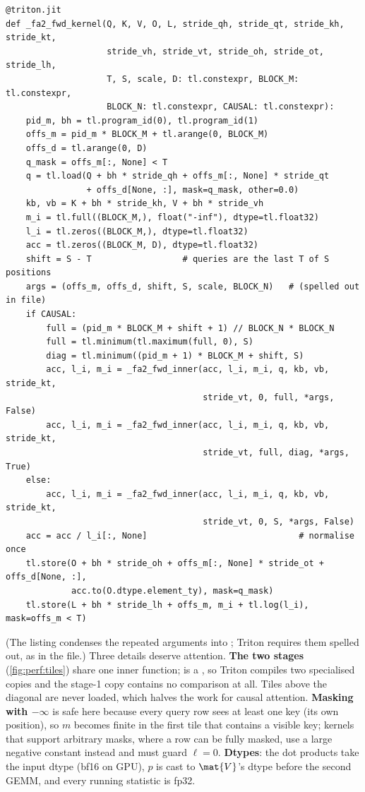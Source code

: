 \begin{lstlisting}[caption={FA2 forward: one program per (query tile, batch$\times$head), reflowed.},label={lst:perf:fa2fwd}]
@triton.jit
def _fa2_fwd_kernel(Q, K, V, O, L, stride_qh, stride_qt, stride_kh, stride_kt,
                    stride_vh, stride_vt, stride_oh, stride_ot, stride_lh,
                    T, S, scale, D: tl.constexpr, BLOCK_M: tl.constexpr,
                    BLOCK_N: tl.constexpr, CAUSAL: tl.constexpr):
    pid_m, bh = tl.program_id(0), tl.program_id(1)
    offs_m = pid_m * BLOCK_M + tl.arange(0, BLOCK_M)
    offs_d = tl.arange(0, D)
    q_mask = offs_m[:, None] < T
    q = tl.load(Q + bh * stride_qh + offs_m[:, None] * stride_qt
                + offs_d[None, :], mask=q_mask, other=0.0)
    kb, vb = K + bh * stride_kh, V + bh * stride_vh
    m_i = tl.full((BLOCK_M,), float("-inf"), dtype=tl.float32)
    l_i = tl.zeros((BLOCK_M,), dtype=tl.float32)
    acc = tl.zeros((BLOCK_M, D), dtype=tl.float32)
    shift = S - T                  # queries are the last T of S positions
    args = (offs_m, offs_d, shift, S, scale, BLOCK_N)   # (spelled out in file)
    if CAUSAL:
        full = (pid_m * BLOCK_M + shift + 1) // BLOCK_N * BLOCK_N
        full = tl.minimum(tl.maximum(full, 0), S)
        diag = tl.minimum((pid_m + 1) * BLOCK_M + shift, S)
        acc, l_i, m_i = _fa2_fwd_inner(acc, l_i, m_i, q, kb, vb, stride_kt,
                                       stride_vt, 0, full, *args, False)
        acc, l_i, m_i = _fa2_fwd_inner(acc, l_i, m_i, q, kb, vb, stride_kt,
                                       stride_vt, full, diag, *args, True)
    else:
        acc, l_i, m_i = _fa2_fwd_inner(acc, l_i, m_i, q, kb, vb, stride_kt,
                                       stride_vt, 0, S, *args, False)
    acc = acc / l_i[:, None]                              # normalise once
    tl.store(O + bh * stride_oh + offs_m[:, None] * stride_ot + offs_d[None, :],
             acc.to(O.dtype.element_ty), mask=q_mask)
    tl.store(L + bh * stride_lh + offs_m, m_i + tl.log(l_i), mask=offs_m < T)
\end{lstlisting}

(The listing condenses the repeated arguments into ; Triton requires them spelled
out, as in the file.) Three details deserve attention. \textbf{The two stages} (\cref{fig:perf:tiles}) share one inner
function;  is a , so Triton compiles two specialised copies and
the stage-1 copy contains no comparison at all. Tiles above the diagonal are never loaded, which
halves the work for causal attention. \textbf{Masking with $-\infty$} is safe here because every
query row sees at least one key (its own position), so $m$ becomes finite in the first tile that
contains a visible key; kernels that support arbitrary masks, where a row can be fully masked, use a
large negative constant instead and must guard $\ell=0$. \textbf{Dtypes}: the dot products take the
input dtype (bf16 on GPU), $p$ is cast to $\mat{V}$'s dtype before the second GEMM, and every
running statistic is fp32.

